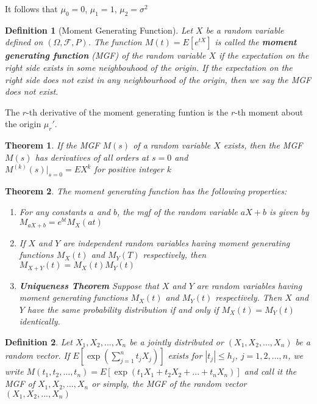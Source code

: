 \documentclass[12pt,twoside]{report}
\newtheorem{defn}{Definition}
\newtheorem{thm}{Theorem}
\begin{document}
It follows that $\mu_0 = 0$, $\mu_1 = 1$, $\mu_2 = \sigma ^2$

\begin{defn}[Moment Generating Function]
    Let $X$ be a random variable defined on $\left (\Omega,  \mathcal{F}, P\right )$. The function $M\left (t\right ) = E\left [e ^{t X}\right ]$ is called the \textbf{moment generating function} (MGF) of the random variable $X$ if the expectation on the right side exists in some neighbouhood of the origin. If the expectation on the right side does not exist in any neighbourhood of the origin, then we say the MGF does not exist.
\end{defn}

\begin{samepage}
The $r$-th derivative of the moment generating funtion is the $r$-th moment about the origin $\mu_r '$.
\begin{thm}
    If the MGF $M(s)$ of a random variable $X$ exists, then the MGF $M(s)$ has derivatives of all orders at $s=0$ and \\

    $M^{(k)} (s) |_{s=0} = EX^k$ for positive integer $k$
\end{thm}

\end{samepage}
\begin{thm}
    The moment generating function has the following properties:
    \begin{enumerate}
        \item For any constants $a$ and $b$, the mgf of the random variable $a X + b$ is given by $M_{aX+b} = e^{bt} M_X(at)$
        \item If $X$ and $Y$ are independent random variables having moment generating functions $M_X(t)$ and $M_Y(T)$ respectively, then $M_{X+Y}(t) = M_X(t) M_Y(t)$
        \item \textbf{Uniqueness Theorem} Suppose that $X$ and $Y$ are random variables having moment generating functions $M_X(t)$ and $M_Y(t)$ respectively. Then $X$ and $Y$ have the same probability distribution if and only if $M_X(t) = M_Y(t)$ identically.
    \end{enumerate}
\end{thm}

\begin{defn}
    Let $X_1, X_2, ..., X_n$ be a jointly distributed or $(X_1, X_2, ..., X_n)$ be a random vector. If $E[\exp ( \sum_{j=1}^n t_j X_j )]$ exists for $|t_j| \leq h_j$, $j = 1, 2, ...,n$, we write $M(t_1, t_2, ..., t_n) = E[\exp(t_1 X_1 + t_2 X_2 + ... + t_n X_n)]$ and call it the MGF of $X_1, X_2, ..., X_n$ or simply, the MGF of the random vector $(X_1, X_2, ..., X_n)$
\end{defn}
\end{document}
